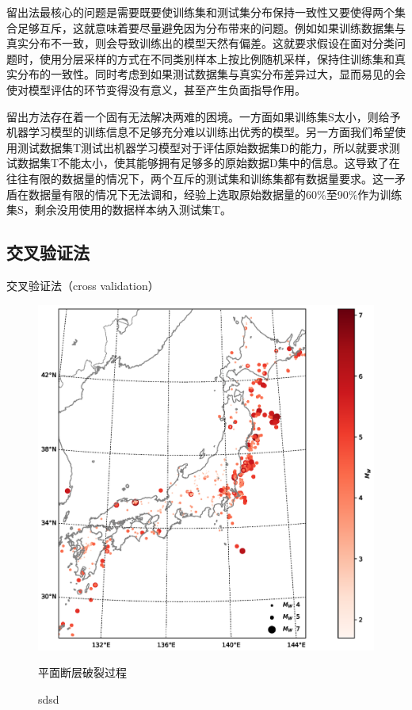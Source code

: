  \indent 留出法最核心的问题是需要既要使训练集和测试集分布保持一致性又要使得两个集合足够互斥，这就意味着要尽量避免因为分布带来的问题。例如如果训练数据集与真实分布不一致，则会导致训练出的模型天然有偏差。这就要求假设在面对分类问题时，使用分层采样的方式在不同类别样本上按比例随机采样，保持住训练集和真实分布的一致性。同时考虑到如果测试数据集与真实分布差异过大，显而易见的会使对模型评估的环节变得没有意义，甚至产生负面指导作用。
 
 \indent 留出方法存在着一个固有无法解决两难的困境。一方面如果训练集S太小，则给予机器学习模型的训练信息不足够充分难以训练出优秀的模型。另一方面我们希望使用测试数据集T测试出机器学习模型对于评估原始数据集D的能力，所以就要求测试数据集T不能太小，使其能够拥有足够多的原始数据D集中的信息。这导致了在往往有限的数据量的情况下，两个互斥的测试集和训练集都有数据量要求。这一矛盾在数据量有限的情况下无法调和，经验上选取原始数据量的60\%至90\%作为训练集S，剩余没用使用的数据样本纳入测试集T。
 
 \subsection{交叉验证法}
 \indent 交叉验证法（cross validation） 
  
  

\begin{figure}[!h]
  \centerin
  \includegraphics[width=0.99\linewidth]{img/4.eps}
    \caption{ 平面断层破裂过程} 
    \caption{ sdsd} 
    \label{fig:rupture-process}
 \end{figure}

